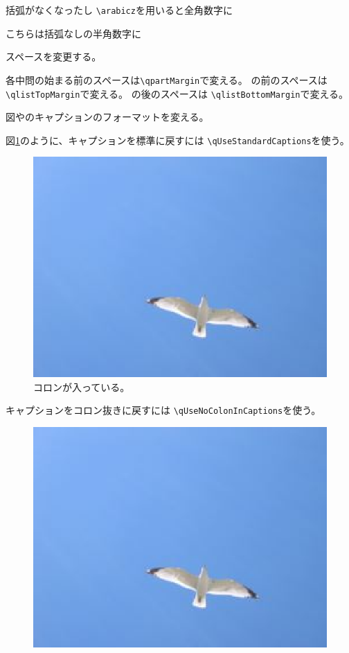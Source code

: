 \documentclass[dvipdfmx,11pt,a4j]{jarticle}
\begin{document}
\begin{qparts}
                \begin{qlist}
                		\qitem 括弧がなくなったし
			\qitem \verb"\arabicz"を用いると全角数字に
				\begin{qlist2}
					\qitem こちらは括弧なしの半角数字に
				\end{qlist2}
                \end{qlist}

	\renewcommand{\qpartFormat}[1]{%
		\item [\LARGE{\textbf{\arabic{#1}}.}]
	}

\addtolength{\qpartMargin}{5mm}
	\qpart スペースを変更する。
		\addtolength{\qlistTopMargin}{-7mm}
		\addtolength{\qlistBottomMargin}{-7mm}
		
		\begin{qlist}
			\qitem 各中問の始まる前のスペースは{\tt \verb"\qpartMargin"}で変える。
			の前のスペースは
					{\tt \verb"\qlistTopMargin"}で変える。
			の後のスペースは
					{\tt \verb"\qlistBottomMargin"}で変える。
		\end{qlist}
	\qpart 図やのキャプションのフォーマットを変える。
		\begin{qlist}
			\qitem 図\ref{fig:standard}のように、キャプションを標準に戻すには
				{\tt \verb"\qUseStandardCaptions"}を使う。
				
				\qUseStandardCaptions
				\begin{figure}[htbp]
					\begin{center}
						\includegraphics[width=0.3\linewidth]{seagull2.eps}
						\caption{コロンが入っている。}
						\label{fig:standard}
					\end{center}
				\end{figure}
				
			\qitem キャプションをコロン抜きに戻すには
				{\tt \verb"\qUseNoColonInCaptions"}を使う。
				
				\qUseNoColonInCaptions
				\begin{figure}[htbp]
					\begin{center}
						\includegraphics[width=0.3\linewidth]{seagull2.eps}
						\caption{\label{fig:nocolon}}
					\end{center}
				\end{figure}
		\end{qlist}
		


\end{qparts}
\end{document}
